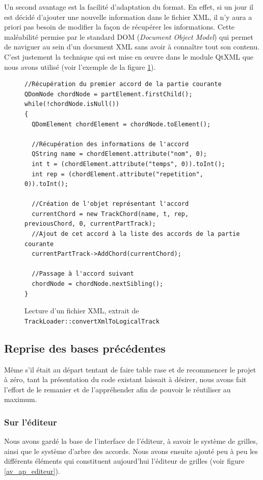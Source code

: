 \documentclass[a4paper,11pt]{article}
\begin{document}
Un second avantage est la facilité d'adaptation du format. En effet, si un jour il est décidé d'ajouter une nouvelle information dans le fichier XML, il n'y aura a priori pas besoin de modifier la façon de récupérer les informations. Cette maléabilité permise par le standard DOM (\textit{Document Object Model}) qui permet de naviguer au sein d'un document XML sans avoir à connaître tout son contenu. C'est justement la technique qui est mise en \oe uvre dans le module QtXML que nous avons utilisé (voir l'exemple de la figure \ref{xml_dom}).

\begin{figure}[H]
\begin{lstlisting}
//Récupération du premier accord de la partie courante
QDomNode chordNode = partElement.firstChild();
while(!chordNode.isNull())
{
  QDomElement chordElement = chordNode.toElement();

  //Récupération des informations de l'accord
  QString name = chordElement.attribute("nom", 0);
  int t = (chordElement.attribute("temps", 0)).toInt();
  int rep = (chordElement.attribute("repetition", 0)).toInt();

  //Création de l'objet représentant l'accord
  currentChord = new TrackChord(name, t, rep, previousChord, 0, currentPartTrack);
  //Ajout de cet accord à la liste des accords de la partie courante
  currentPartTrack->AddChord(currentChord);

  //Passage à l'accord suivant
  chordNode = chordNode.nextSibling();
}
\end{lstlisting}
\caption{Lecture d'un fichier XML, extrait de \texttt{TrackLoader::convertXmlToLogicalTrack}}
\label{xml_dom}
\end{figure}

\subsection{Reprise des bases précédentes}

Même s'il était au départ tentant de faire table rase et de recommencer le projet à zéro, tant la présentation du code existant laissait à désirer, nous avons fait l'effort de le remanier et de l'appréhender afin de pouvoir le réutiliser au maximum.

\subsubsection{Sur l'éditeur}

Nous avons gardé la base de l'interface de l'éditeur, à savoir le système de grilles, ainsi que le système d'arbre des accords. Nous avons ensuite ajouté peu à peu les différents éléments qui constituent aujourd'hui l'éditeur de grilles (voir figure \ref{av_ap_editeur}).
\end{document}
